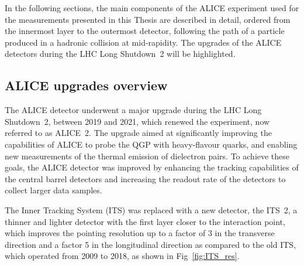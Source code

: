 In the following sections, the main components of the ALICE experiment used for the measurements presented in this Thesis are described in detail, ordered from the innermost layer to the outermost detector, following the path of a particle produced in a hadronic collision at mid-rapidity. The upgrades of the ALICE detectors during the LHC Long Shutdown~2 will be highlighted.

\subsection{ALICE upgrades overview}
The ALICE detector underwent a major upgrade during the LHC Long Shutdown~2, between 2019 and 2021, which renewed the experiment, now referred to as ALICE~2. The upgrade aimed at significantly improving the capabilities of ALICE to probe the QGP with heavy-flavour quarks, and enabling new measurements of the thermal emission of dielectron pairs. To achieve these goals, the ALICE detector was improved by enhancing the tracking capabilities of the central barrel detectors and increasing the readout rate of the detectors to collect larger data samples. 

The Inner Tracking System (ITS) was replaced with a new detector, the ITS~2, a thinner and lighter detector with the first layer closer to the interaction point, which improves the pointing resolution up to a factor of 3 in the transverse direction and a factor 5 in the longitudinal direction as compared to the old ITS, which operated from 2009 to 2018, as shown in Fig~\ref{fig:ITS_res}.

